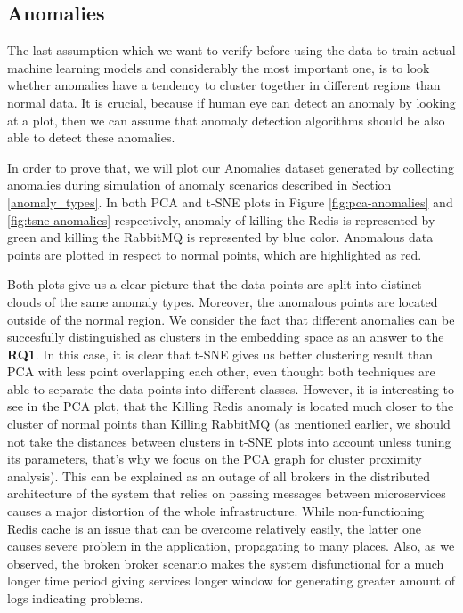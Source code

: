 \subsection{Anomalies}
The last assumption which we want to verify before using the data to train actual machine learning models and considerably the most important one, is to look whether anomalies have a tendency to cluster together in different regions than normal data. It is crucial, because if human eye can detect an anomaly by looking at a plot, then we can assume that anomaly detection algorithms should be also able to detect these anomalies. 

In order to prove that, we will plot our Anomalies dataset generated by collecting anomalies during simulation of anomaly scenarios described in Section \ref{anomaly_types}. In both PCA and t-SNE plots in Figure \ref{fig:pca-anomalies} and \ref{fig:tsne-anomalies} respectively, anomaly of killing the Redis is represented by green and killing the RabbitMQ is represented by blue color. Anomalous data points are plotted in respect to normal points, which are highlighted as red. 

Both plots give us a clear picture that the data points are split into distinct clouds of the same anomaly types. Moreover, the anomalous points are located outside of the normal region. We consider the fact that different anomalies can be succesfully distinguished as clusters in the embedding space as an answer to the \textbf{RQ1}. In this case, it is clear that t-SNE gives us better clustering result than PCA with less point overlapping each other, even thought both techniques are able to separate the data points into different classes. However, it is interesting to see in the PCA plot, that the Killing Redis anomaly is located much closer to the cluster of normal points than Killing RabbitMQ (as mentioned earlier, we should not take the distances between clusters in t-SNE plots into account unless tuning its parameters, that's why we focus on the PCA graph for cluster proximity analysis). This can be explained as an outage of all brokers in the distributed architecture of the system that relies on passing messages between microservices causes a major distortion of the whole infrastructure. 
While non-functioning Redis cache is an issue that can be overcome relatively easily, the latter one causes severe problem in the application, propagating to many places. Also, as we observed, the broken broker scenario makes the system disfunctional for a much longer time period giving services longer window for generating greater amount of logs indicating problems.

